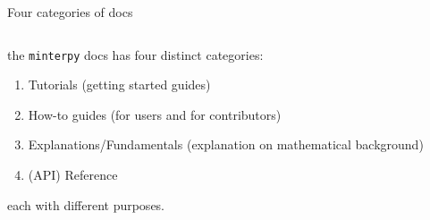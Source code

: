 \documentclass[english,aspectratio=169]{beamer}
\begin{document}
\begin{frame}{Four categories of docs}
\footnotesize

\begin{columns}[onlytextwidth]

\begin{column}{0.5\textwidth}

the \texttt{minterpy} docs has four distinct categories:

\vspace{0.5em}

\begin{enumerate}
    \item Tutorials (getting started guides)
    \item How-to guides (for users and for contributors)
    \item Explanations/Fundamentals (explanation on mathematical background)
    \item (API) Reference
\end{enumerate}

\vspace{0.5em}

each with different purposes.

\end{column}


\end{columns}
\end{frame}
\end{document}
